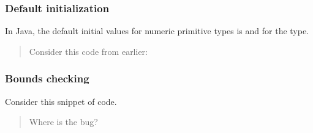 \documentclass[letterpaper,10pt,english,openany,oneside]{sphinxmanual}
\begin{document}
\subsubsection{Default initialization}
\label{\detokenize{arrays-arraylists:default-initialization}}
In Java, the default initial values for numeric primitive types is  and  for the  type.
\begin{quote}

 Consider this code from earlier:

\begin{sphinxVerbatim}[commandchars=\\\{\}]
\PYG{p}{[}\PYG{p}{]} 
   \PYG{p}{[}\PYG{p}{]}
         
    \PYG{p}{[}\PYG{p}{]}  

       
\end{sphinxVerbatim}
\end{quote}


\subsubsection{Bounds checking}
\label{\detokenize{arrays-arraylists:bounds-checking}}
Consider this snippet of code.
\begin{quote}

 Where is the bug?

\begin{sphinxVerbatim}[commandchars=\\\{\}]
\PYG{p}{[}\PYG{p}{]}    \PYG{p}{[}\PYG{p}{]}
         
    \PYG{p}{[}\PYG{p}{]}
\end{sphinxVerbatim}
\end{quote}
\end{document}

